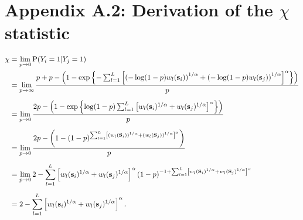 \documentclass[11pt]{article}
\begin{document}
\section*{Appendix A.2: Derivation of the $\chi$ statistic}
\begin{align} \label{chi}
  \chi &= \lim_{p \rightarrow 0 }\text{P}(Y_i = 1|Y_j = 1)\nonumber \\
   &= \lim_{p \rightarrow \infty }\frac{ p + p - \left( 1 - \exp \left \{ - \sum_{ l = 1 }^{ L } \left[ \left( -\log(1-p) w_{l}(\mbox{\bf s}_i) \right)^{ 1/\alpha } + \left( -\log(1 - p) w_{ l}(\mbox{\bf s}_j) \right)^{ 1/\alpha } \right]^{\alpha} \right \} \right) }{ p } \nonumber \\[0.5em]
  &= \lim_{p \rightarrow 0 } \frac{ 2p - \left( 1 - \exp \left \{ \log(1-p) \sum_{ l = 1 }^{ L } \left[  w_{l}(\mbox{\bf s}_i) ^{ 1/\alpha } +  w_{ l}(\mbox{\bf s}_j) ^{ 1/\alpha } \right]^{\alpha} \right \} \right) }{ p } \nonumber \\[0.5em]
  &= \lim_{p \rightarrow 0 } \frac{ 2p - \left( 1 - (1-p)^{ \sum_{ l = 1 }^{ L } \left[ \left( w_{l}(\mbox{\bf s}_i) \right)^{ 1/\alpha } + \left( w_{ l}(\mbox{\bf s}_j) \right)^{ 1/\alpha } \right]^\alpha } \right) }{ p } \nonumber \\[0.5em]
  &=\lim_{p \rightarrow 0 } 2 -\sum_{ l = 1 }^{ L } \left[ w_{l}(\mbox{\bf s}_i) ^{ 1/\alpha } +  w_{ l} (\mbox{\bf s}_j)^{ 1/\alpha } \right]^\alpha ( 1 - p)^{ -1 + \sum_{ l = 1 }^{ L } \left[  w_{l}(\mbox{\bf s}_i) ^{ 1/\alpha } +  w_{ l}(\mbox{\bf s}_j)^{ 1/\alpha } \right]^\alpha } \nonumber \\[0.5em]
  &= 2 -  \sum_{ l = 1 }^{ L } \left[ w_{l}(\mbox{\bf s}_i)^{ 1/\alpha } +  w_{ l}(\mbox{\bf s}_j) ^{ 1/\alpha } \right]^\alpha.
\end{align}

\begin{singlespace}


\end{singlespace}
\end{document}
